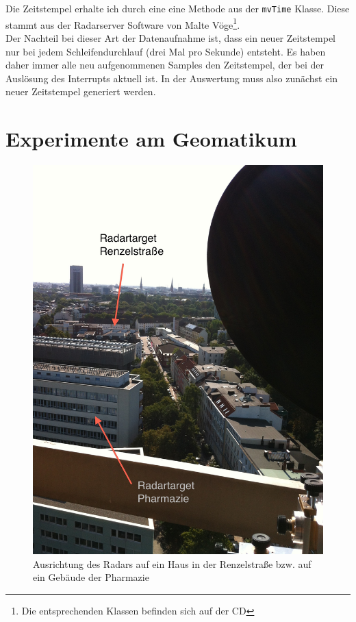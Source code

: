 \documentclass[12pt,a4paper,twoside,BCOR=12.5mm]{scrartcl}
\begin{document}
Die Zeitstempel erhalte ich durch eine eine Methode aus der \texttt{mvTime} Klasse. Diese stammt aus der Radarserver Software von Malte Vöge\footnote{Die entsprechenden Klassen befinden sich auf der CD}. \\

Der Nachteil bei dieser Art der Datenaufnahme ist, dass ein neuer Zeitstempel nur bei jedem Schleifendurchlauf (drei Mal pro Sekunde) entsteht. Es haben daher immer alle neu aufgenommenen Samples den Zeitstempel, der bei der Auslösung des Interrupts aktuell ist. In der Auswertung muss also zunächst ein neuer Zeitstempel generiert werden.

\newpage

\section{Experimente am Geomatikum}

\begin{figure}[htb]
\centering
\includegraphics[scale=.13]{targets.jpg}
\caption{Ausrichtung des Radars auf ein Haus in der Renzelstraße bzw. auf ein Gebäude der Pharmazie}
\label{targets}
\end{figure}
\end{document}
